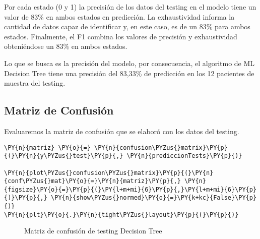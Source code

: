 	Por cada estado (0 y 1) la precisión de los datos del testing en el modelo tiene un valor de 83\% en ambos estados en predicción. La exhaustividad informa la cantidad de datos capaz de identificar y, en este caso, es de un 83\% para ambos estados. Finalmente, el F1 combina los valores de precisión y exhaustividad obteniéndose un 83\% en ambos estados. 
\par Lo que se busca es la precisión del modelo, por consecuencia, el algoritmo de ML Decision Tree tiene una precisión del 83,33\% de predicción en los 12 pacientes de muestra del testing.\\

    \hypertarget{matriz-de-confusiuxf3n}{%
\subsection{Matriz de Confusión}\label{matriz-de-confusiuxf3n}}

Evaluaremos la matriz de confusión que se elaboró con los datos del testing.

    \begin{tcolorbox}[breakable, size=fbox, boxrule=1pt, pad at break*=1mm,colback=cellbackground, colframe=cellborder]
\begin{Verbatim}[commandchars=\\\{\}]
\PY{n}{matriz} \PY{o}{=} \PY{n}{confusion\PYZus{}matrix}\PY{p}{(}\PY{n}{y\PYZus{}test}\PY{p}{,} \PY{n}{prediccionTests}\PY{p}{)}

\PY{n}{plot\PYZus{}confusion\PYZus{}matrix}\PY{p}{(}\PY{n}{conf\PYZus{}mat}\PY{o}{=}\PY{n}{matriz}\PY{p}{,} \PY{n}{figsize}\PY{o}{=}\PY{p}{(}\PY{l+m+mi}{6}\PY{p}{,}\PY{l+m+mi}{6}\PY{p}{)}\PY{p}{,} \PY{n}{show\PYZus{}normed}\PY{o}{=}\PY{k+kc}{False}\PY{p}{)}
\PY{n}{plt}\PY{o}{.}\PY{n}{tight\PYZus{}layout}\PY{p}{(}\PY{p}{)}
\end{Verbatim}
\end{tcolorbox}

\begin{center}
    	\begin{figure}[H]
	\centering
	\caption{Matriz de confusión de testing Decision Tree}
	\label{fig:mctdt}
	\end{figure}
\end{center}
    
